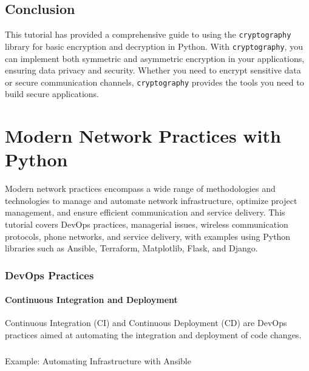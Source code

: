 \documentclass[
  letterpaper,
  DIV=11,
  numbers=noendperiod]{scrreprt}
\makeatletter
\let\oldparagraph\paragraph
\renewcommand{\paragraph}{
    \@ifstar
      \xxxParagraphStar
      \xxxParagraphNoStar
  }
\newcommand{\xxxParagraphStar}[1]{\oldparagraph*{#1}\mbox{}}
\newcommand{\xxxParagraphNoStar}[1]{\oldparagraph{#1}\mbox{}}
\makeatother
\begin{document}
\section{Conclusion}\label{conclusion-38}

This tutorial has provided a comprehensive guide to using the
\texttt{cryptography} library for basic encryption and decryption in
Python. With \texttt{cryptography}, you can implement both symmetric and
asymmetric encryption in your applications, ensuring data privacy and
security. Whether you need to encrypt sensitive data or secure
communication channels, \texttt{cryptography} provides the tools you
need to build secure applications.


\chapter{Modern Network Practices with
Python}\label{modern-network-practices-with-python}

Modern network practices encompass a wide range of methodologies and
technologies to manage and automate network infrastructure, optimize
project management, and ensure efficient communication and service
delivery. This tutorial covers DevOps practices, managerial issues,
wireless communication protocols, phone networks, and service delivery,
with examples using Python libraries such as Ansible, Terraform,
Matplotlib, Flask, and Django.

\subsection{DevOps Practices}\label{devops-practices}

\subsubsection{Continuous Integration and
Deployment}\label{continuous-integration-and-deployment}

Continuous Integration (CI) and Continuous Deployment (CD) are DevOps
practices aimed at automating the integration and deployment of code
changes.

\paragraph{Example: Automating Infrastructure with
Ansible}\label{example-automating-infrastructure-with-ansible}
\end{document}
